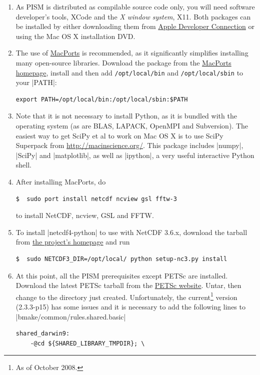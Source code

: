 \documentclass[11pt,final]{amsart}
\begin{document}
\begin{enumerate}
\item As PISM is distributed as compilable source code only, you will need software developer's tools, XCode and the \emph{X
    window system}, X11. Both packages can be installed by either downloading them from
  \href{http://developer.apple.com/tools/xcode/}{Apple Developer Connection} or using the Mac OS X installation DVD.
\item The use of \href{http://www.macports.org/}{MacPorts} is recommended, as it significantly simplifies installing many
  open-source libraries. Download the package from the \href{http://www.macports.org/install.php}{MacPorts homepage}, install and
  then add \verb|/opt/local/bin| and \verb|/opt/local/sbin| to your |PATH|:
\begin{verbatim}
export PATH=/opt/local/bin:/opt/local/sbin:$PATH
\end{verbatim}
\item Note that it is not necessary to install Python, as it is bundled with the operating system (as are BLAS, LAPACK, OpenMPI and
  Subversion). The easiest way to get SciPy et al to work on Mac OS X is to use SciPy Superpack from
  \url{http://macinscience.org/}. This package includes |numpy|, |SciPy| and |matplotlib|, as well as |ipython|, a very useful
  interactive Python shell.
\item After installing MacPorts, do
\begin{verbatim}
$  sudo port install netcdf ncview gsl fftw-3
\end{verbatim}
to install NetCDF, ncview, GSL and FFTW.
\item To install |netcdf4-python| to use with NetCDF 3.6.x, download the tarball from \href{http://code.google.com/p/netcdf4-python/}{the project's homepage} and run
\begin{verbatim}
$  sudo NETCDF3_DIR=/opt/local/ python setup-nc3.py install
\end{verbatim}
\item At this point, all the PISM prerequisites except PETSc are installed. Download the latest PETSc tarball from the
  \href{ftp://ftp.mcs.anl.gov/pub/petsc/release-snapshots/}{PETSc website}. Untar, then change to the directory just created.
  Unfortunately, the current\footnote{As of October 2008.} version (2.3.3-p15) has some issues and it is necessary to add the following lines to
  |bmake/common/rules.shared.basic| {\scriptsize
\begin{verbatim}
shared_darwin9:
	-@cd ${SHARED_LIBRARY_TMPDIR}; \

\end{verbatim}}
\end{enumerate}
\end{document}

